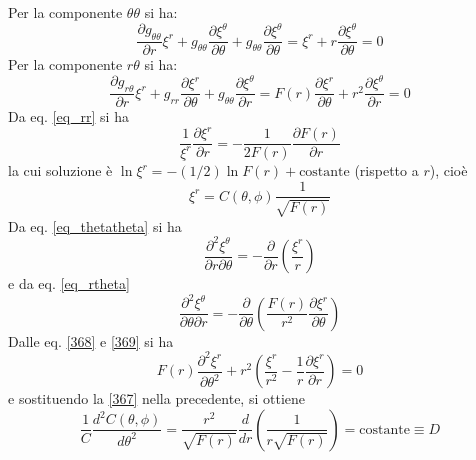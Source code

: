 Per la componente $\theta \theta$ si ha:
\begin{equation}
  \frac{\partial g_{\theta \theta}}{\partial r} \xi^r +
  g_{\theta \theta}\frac{\partial \xi^{\theta} }{\partial \theta} +
  g_{\theta \theta}\frac{\partial \xi^{\theta} }{\partial \theta} =
  \xi^r +  r \frac{\partial \xi^{\theta} }{\partial \theta} = 0
  \label{eq_thetatheta}
\end{equation}
Per la componente $r \theta$ si ha:
\begin{equation}
  \frac{\partial g_{r \theta}}{\partial r} \xi^r +
  g_{rr}\frac{\partial \xi^r       }{\partial \theta} +
  g_{\theta \theta} \frac{\partial \xi^{\theta}  }{\partial r} =
  F(r) \frac{\partial \xi^r}{\partial \theta}  +
  r^2  \frac{\partial \xi^{\theta} }{\partial r} = 0
  \label{eq_rtheta}
\end{equation}
Da eq. \eqref{eq_rr} si ha
\begin{equation}
  \frac{1}{\xi^r} \frac{\partial \xi^r}{\partial r} =-\frac{1}{2 F(r)}
  \frac{\partial F(r)}{\partial r}
\end{equation}
la cui soluzione è $\ln \xi^r =-(1/2) \ln F(r) + \text{costante}$ (rispetto a
\(r\)), cioè
\begin{equation}
  \xi^r = C(\theta, \phi) \frac{1}{\sqrt {F(r)}}
  \label{367}
\end{equation}
Da eq. \eqref{eq_thetatheta} si ha
\begin{equation}
  \frac{\partial^2 \xi^{\theta} }{\partial r \partial \theta} = -
  \frac{\partial}{\partial r } \left(\frac{\xi^r}{r}\right)
  \label{368}
\end{equation}
e da eq. \eqref{eq_rtheta}
\begin{equation}
  \frac{\partial^2 \xi^{\theta} }{\partial \theta \partial r} = -
  \frac{\partial}{\partial \theta } \left( \frac{F(r)}{r^2} \frac{\partial
      \xi^r}{\partial \theta}\right)
  \label{369}
\end{equation}
Dalle eq. \eqref{368} e \eqref{369} si ha
\begin{equation}
  F(r) \frac{\partial^2 \xi^r}{\partial \theta^2} +
  r^2 \left( \frac{\xi^r}{r^2} -\frac{1}{r} \frac{\partial \xi^r}{\partial r}
  \right) = 0
\end{equation}
e sostituendo la \eqref{367} nella precedente,  si ottiene
\begin{equation}
  \frac{1}{C} \frac{d^2 C(\theta,\phi)}{d \theta^2} =
  \frac{r^2}{\sqrt{ F(r)}} \frac{d}{dr} \left( \frac{1}{r \sqrt{F(r)}}\right)=
  \text{costante} \equiv D
\end{equation}
